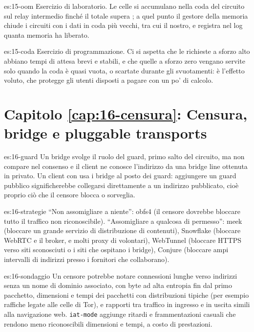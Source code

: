 \begin{soluzione}{es:15-oom}
Esercizio di laboratorio. Le celle si accumulano nella coda del circuito sul relay intermedio finché il totale supera ; a quel punto il gestore della memoria chiude i circuiti con i dati in coda più vecchi, tra cui il nostro, e registra nel log quanta memoria ha liberato.
\end{soluzione}

\begin{soluzione}{es:15-coda}
Esercizio di programmazione. Ci si aspetta che le richieste a sforzo alto abbiano tempi di attesa brevi e stabili, e che quelle a sforzo zero vengano servite solo quando la coda è quasi vuota, o scartate durante gli svuotamenti: è l'effetto voluto, che protegge gli utenti disposti a pagare con un po' di calcolo.
\end{soluzione}

\section*{Capitolo \ref{cap:16-censura}: Censura, bridge e pluggable transports}

\begin{soluzione}{es:16-guard}
Un bridge svolge il ruolo del guard, primo salto del circuito, ma non compare nel consenso e il client ne conosce l'indirizzo da una bridge line ottenuta in privato. Un client con  usa i bridge al posto dei guard: aggiungere un guard pubblico significherebbe collegarsi direttamente a un indirizzo pubblicato, cioè proprio ciò che il censore blocca o sorveglia.
\end{soluzione}

\begin{soluzione}{es:16-strategie}
\enquote{Non assomigliare a niente}: obfs4 (il censore dovrebbe bloccare tutto il traffico non riconoscibile). \enquote{Assomigliare a qualcosa di permesso}: meek (bloccare un grande servizio di distribuzione di contenuti), Snowflake (bloccare WebRTC e il broker, e molti proxy di volontari), WebTunnel (bloccare HTTPS verso siti sconosciuti o i siti che ospitano i bridge), Conjure (bloccare ampi intervalli di indirizzi presso i fornitori che collaborano).
\end{soluzione}

\begin{soluzione}{es:16-sondaggio}
Un censore potrebbe notare connessioni lunghe verso indirizzi senza un nome di dominio associato, con byte ad alta entropia fin dal primo pacchetto, dimensioni e tempi dei pacchetti con distribuzioni tipiche (per esempio raffiche legate alle celle di Tor), e rapporti tra traffico in ingresso e in uscita simili alla navigazione web. \texttt{iat-mode} aggiunge ritardi e frammentazioni casuali che rendono meno riconoscibili dimensioni e tempi, a costo di prestazioni.
\end{soluzione}

